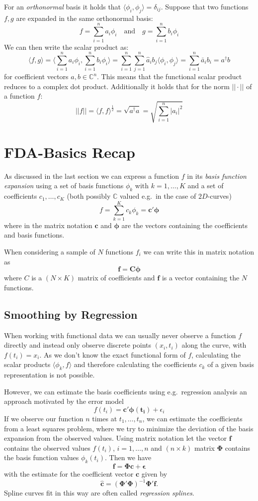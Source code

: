 For an \textit{orthonormal} basis it holds that $\langle \phi_i, \phi_j \rangle = \delta_{ij}$. Suppose that two functions $f,g$ are expanded in the same orthonormal basis:
$$ f = \sum_{i=1}^n a_i \phi_i \quad \text{and} \quad 
  g = \sum_{i=1}^n b_i \phi_i $$
We can then write the scalar product as:
$$ \langle f,g \rangle = 
  \langle \sum_{i=1}^n a_i \phi_i, \sum_{i=1}^n b_i \phi_i \rangle = 
  \sum_{i=1}^n \sum_{j=1}^n \hat{a}_i b_j \langle \phi_i, \phi_j \rangle =
  \sum_{i=1}^n \bar{a}_i b_i = a^\dagger b$$
for coefficient vectors $a, b \in \mathbb{C}^n$. This means that the functional scalar product reduces to a complex dot product. Additionally it holds that for the norm $||\cdot||$ of a function $f$:
$$ ||f|| = \langle f,f \rangle^{\frac{1}{2}} = 
  \sqrt{a^\dagger a} = \sqrt{\sum_{i=1}^n |a_i|^2}$$

\section{FDA-Basics Recap}
As discussed in the last section we can express a function $f$ in its \textit{basis function expansion} using a set of basis functions $\phi_k$ with $k=1,\dots,K$ and a set of coefficients $c_1,\dots,c_K$ (both possibly $\mathbb{C}$ valued e.g.\ in the case of $2D$-curves)
$$ f = \sum_{k=1}^K c_k \phi_k = \bm{c'}\bm{\phi} $$
where in the matrix notation $\bm{c}$ and $\bm{\phi}$ are the vectors containing the coefficients and basis functions.

When considering a sample of $N$ functions $f_i$ we can write this in matrix notation as 
$$ \bm{f} = \bm{C}\bm{\phi} $$
where $C$ is a $(N \times K)$ matrix of coefficients and $\bm{f}$ is a vector containing the $N$ functions.

\subsection{Smoothing by Regression}
When working with functional data we can usually never observe a function $f$ directly and instead only observe discrete points $(x_i, t_i)$ along the curve, with $f(t_i) = x_i$.
As we don't know the exact functional form of $f$, calculating the scalar products $\langle \phi_k, f \rangle$ and therefore calculating the coefficients $c_k$ of a given basis representation is not possible.

However, we can estimate the basis coefficients using e.g.\ regression analysis an approach motivated by the error model
$$ f(t_i) = \bm{c'}\bm{\phi(t_i)} + \epsilon_i $$
If we observe our function $n$ times at $t_1,\dots,t_n$, we can estimate the coefficients from a least squares problem, where we try to minimize the deviation of the basis expansion from the observed values.
Using matrix notation let the vector $\bm{f}$ contains the observed values $f(t_i)$, $i=1,\dots,n$ and $(n \times k)$ matrix $\bm{\Phi}$ contains the basis function values $\phi_k(t_i)$.
Then we have
$$ \bm{f} = \bm{\Phi}\bm{c} + \bm{\epsilon} $$
with the estimate for the coefficient vector $\bm{c}$ given by
$$ \hat{\bm{c}} = \left( \bm{\Phi'} \bm{\Phi}\right)^{-1} \bm{\Phi'} \bm{f}. $$
Spline curves fit in this way are often called \textit{regression splines}.


